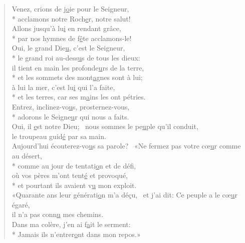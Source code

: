 \begin{verse}
Venez, crions de j\underline{o}ie pour le Seigneur, \\*
acclamons notre Roch\underline{e}r, notre salut! \\
Allons jusqu’à lu\underline{i} en rendant grâce, \\*
par nos hymnes de f\underline{ê}te acclamons-le! \\

Oui, le grand Die\underline{u}, c’est le Seigneur, \\*
le grand roi au-dess\underline{u}s de tous les dieux: \\
il tient en main les profonde\underline{u}rs de la terre, \\*
et les sommets des mont\underline{a}gnes sont à lui; \\
à lui la mer, c’est lu\underline{i} qui l’a faite, \\*
et les terres, car ses m\underline{a}ins les ont pétries. \\

Entrez, inclinez-vo\underline{u}s, prosternez-vous, \\*
adorons le Seigne\underline{u}r qui nous a faits. \\
Oui, il \underline{e}st notre Dieu;~\psalmdagger
nous sommes le pe\underline{u}ple qu’il conduit, \\
le troupeau guid\underline{é} par sa main. \\

Aujourd’hui écouterez-vo\underline{u}s sa parole?~\psalmdagger
{}«Ne fermez pas votre cœ\underline{u}r comme au désert, \\*
comme au jour de tentati\underline{o}n et de défi, \\
où vos pères m’ont tent\underline{é} et provoqué, \\*
et pourtant ils avaient v\underline{u} mon exploit. \\

«Quarante ans leur générati\underline{o}n m’a déçu,~\psalmdagger
et j’ai dit: Ce peuple a le cœ\underline{u}r égaré, \\
il n’a pas conn\underline{u} mes chemins. \\
Dans ma colère, j’en ai f\underline{a}it le serment: \\*
Jamais ils n’entrer\underline{o}nt dans mon repos.» \\
\end{verse}

